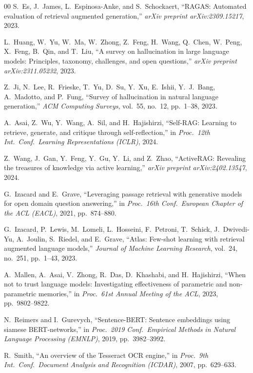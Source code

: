 \documentclass[conference]{IEEEtran}
\begin{document}
\begin{thebibliography}{00}
S.~Es, J.~James, L.~Espinosa-Anke, and S.~Schockaert,
``RAGAS: Automated evaluation of retrieval augmented generation,''
\textit{arXiv preprint arXiv:2309.15217}, 2023.

L.~Huang, W.~Yu, W.~Ma, W.~Zhong, Z.~Feng, H.~Wang, Q.~Chen, W.~Peng,
X.~Feng, B.~Qin, and T.~Liu,
``A survey on hallucination in large language models: Principles, taxonomy,
challenges, and open questions,''
\textit{arXiv preprint arXiv:2311.05232}, 2023.

Z.~Ji, N.~Lee, R.~Frieske, T.~Yu, D.~Su, Y.~Xu, E.~Ishii, Y.~J.~Bang,
A.~Madotto, and P.~Fung,
``Survey of hallucination in natural language generation,''
\textit{ACM Computing Surveys}, vol.~55, no.~12, pp.~1--38, 2023.

A.~Asai, Z.~Wu, Y.~Wang, A.~Sil, and H.~Hajishirzi,
``Self-RAG: Learning to retrieve, generate, and critique through
self-reflection,''
in \textit{Proc.\ 12th Int.\ Conf.\ Learning Representations (ICLR)}, 2024.

Z.~Wang, J.~Gan, Y.~Feng, Y.~Gu, Y.~Li, and Z.~Zhao,
``ActiveRAG: Revealing the treasures of knowledge via active learning,''
\textit{arXiv preprint arXiv:2402.13547}, 2024.

G.~Izacard and E.~Grave,
``Leveraging passage retrieval with generative models for open domain
question answering,''
in \textit{Proc.\ 16th Conf.\ European Chapter of the ACL (EACL)},
2021, pp.~874--880.

G.~Izacard, P.~Lewis, M.~Lomeli, L.~Hosseini, F.~Petroni, T.~Schick,
J.~Dwivedi-Yu, A.~Joulin, S.~Riedel, and E.~Grave,
``Atlas: Few-shot learning with retrieval augmented language models,''
\textit{Journal of Machine Learning Research}, vol.~24, no.~251,
pp.~1--43, 2023.

A.~Mallen, A.~Asai, V.~Zhong, R.~Das, D.~Khashabi, and H.~Hajishirzi,
``When not to trust language models: Investigating effectiveness of
parametric and non-parametric memories,''
in \textit{Proc.\ 61st Annual Meeting of the ACL}, 2023, pp.~9802--9822.

N.~Reimers and I.~Gurevych,
``Sentence-BERT: Sentence embeddings using siamese BERT-networks,''
in \textit{Proc.\ 2019 Conf.\ Empirical Methods in Natural Language Processing
(EMNLP)}, 2019, pp.~3982--3992.

R.~Smith,
``An overview of the Tesseract OCR engine,''
in \textit{Proc.\ 9th Int.\ Conf.\ Document Analysis and Recognition
(ICDAR)}, 2007, pp.~629--633.


\end{thebibliography}
\end{document}
